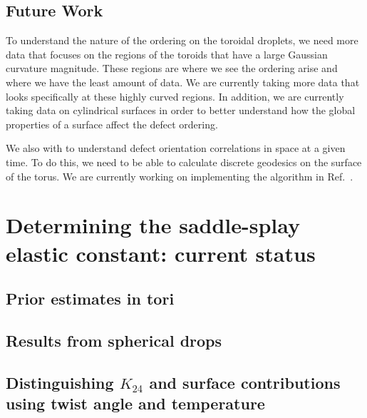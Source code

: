 \subsection{Future Work}
To understand the nature of the ordering on the toroidal droplets, we need more data that focuses on the regions of the toroids that have a large Gaussian curvature magnitude.
These regions are where we see the ordering arise and where we have the least amount of data.
We are currently taking more data that looks specifically at these highly curved regions.
In addition, we are currently taking data on cylindrical surfaces in order to better understand how the global properties of a surface affect the defect ordering.

We also with to understand defect orientation correlations in space at a given time.
To do this, we need to be able to calculate discrete geodesics on the surface of the torus.
We are currently working on implementing the algorithm in Ref.~.



\section{Determining the saddle-splay elastic constant: current status}
\subsection{Prior estimates in tori}
\subsection{Results from spherical drops}
\subsection{Distinguishing $K_{24}$ and surface contributions using twist angle and temperature}
